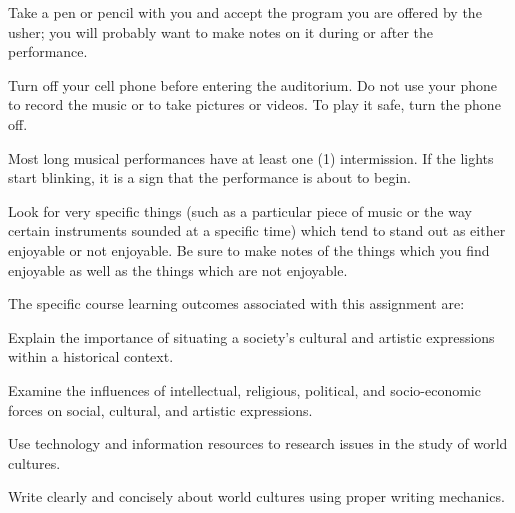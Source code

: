\begin{enumerate*}
\begin{itemize*}
			\item Take a pen or pencil with you and accept the program you are offered by the usher; you will probably want to make notes on it during or after the performance.
			\item Turn off your cell phone before entering the auditorium. Do not use your phone to record the music or to take pictures or videos. To play it safe, turn the phone off.
			\item Most long musical performances have at least one (1) intermission. If the lights start blinking, it is a sign that the performance is about to begin.
			\item Look for very specific things (such as a particular piece of music or the way certain instruments sounded at a specific time) which tend to stand out as either enjoyable or not enjoyable. Be sure to make notes of the things which you find enjoyable as well as the things which are not enjoyable.
		\end{itemize*}
\end{enumerate*}

The specific course learning outcomes associated with this assignment are:
\begin{itemize*}
	\item Explain the importance of situating a society's cultural and artistic expressions within a historical context.
	\item Examine the influences of intellectual, religious, political, and socio-economic forces on social, cultural, and artistic expressions.
	\item Use technology and information resources to research issues in the study of world cultures.
	\item Write clearly and concisely about world cultures using proper writing mechanics.
\end{itemize*}

